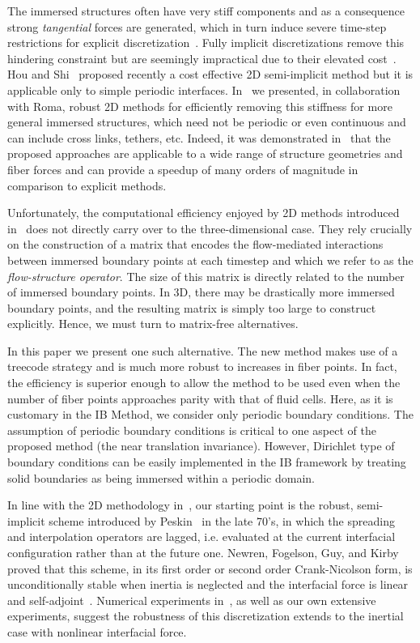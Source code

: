 \documentclass[preprint,12pt]{elsarticle}
\begin{document}
The immersed structures often have very stiff components and as a consequence strong  {\em tangential} forces are generated,  which in turn   induce severe time-step restrictions for explicit discretization~\cite{SW95,SW99}.  Fully implicit discretizations remove this  hindering constraint but are seemingly impractical due to their elevated cost~\cite{TP92, MP93}. Hou and Shi~\cite{HS2008b,HS2008a} proposed recently a cost effective 2D semi-implicit method  but it is applicable only to simple periodic interfaces.
In~\cite{IBM_Implicit2D} we presented, in collaboration with Roma, robust 2D methods for efficiently removing this stiffness  for more general immersed structures, which need not be periodic or even continuous and can include cross links, tethers, etc. Indeed, it was demonstrated in~\cite{IBM_Implicit2D} that the proposed approaches  are applicable to a wide range of structure geometries and fiber forces and can provide a speedup of many orders of magnitude in comparison to explicit methods.

Unfortunately,  the computational efficiency enjoyed by  2D methods introduced in~\cite{IBM_Implicit2D} 
does not directly carry over to the three-dimensional case. They rely crucially on the construction of a matrix that encodes the flow-mediated  interactions between immersed boundary points at each timestep and which we refer to as the {\em flow-structure operator}. The size of this matrix is directly related to the number of immersed boundary points. In 3D,  there may be drastically more immersed boundary points, and the resulting matrix is simply too large to construct explicitly. Hence, we must turn to matrix-free alternatives.

In this paper we present one such alternative. The new method makes use of a treecode strategy and is much more robust to increases in fiber points. In fact, the efficiency is superior enough to allow the method to be used even when the number of fiber points approaches parity with that  of fluid cells. Here, as it is customary in the IB Method,  we consider only periodic boundary conditions. The assumption of periodic boundary conditions is critical to one aspect of the proposed method (the near translation invariance). However, Dirichlet type of boundary conditions can be easily implemented in the IB framework by treating solid boundaries as being immersed within a periodic domain.


In line with the 2D methodology in~\cite{IBM_Implicit2D}, our starting point is the robust, semi-implicit scheme introduced by Peskin~\cite{Peskin77} in the late 70's, in which
the spreading and interpolation operators are lagged, i.e. evaluated at the current interfacial configuration rather than at the future one. Newren, Fogelson, Guy, and Kirby
proved that this scheme, in its first order or second order Crank-Nicolson form, is unconditionally stable when inertia is neglected and the interfacial  force is linear and self-adjoint~\cite{NFGK2007}. Numerical experiments in~\cite{NFGK2007}, as well as our own extensive experiments, suggest the robustness of this discretization extends to the inertial case with nonlinear interfacial force.
\end{document}
